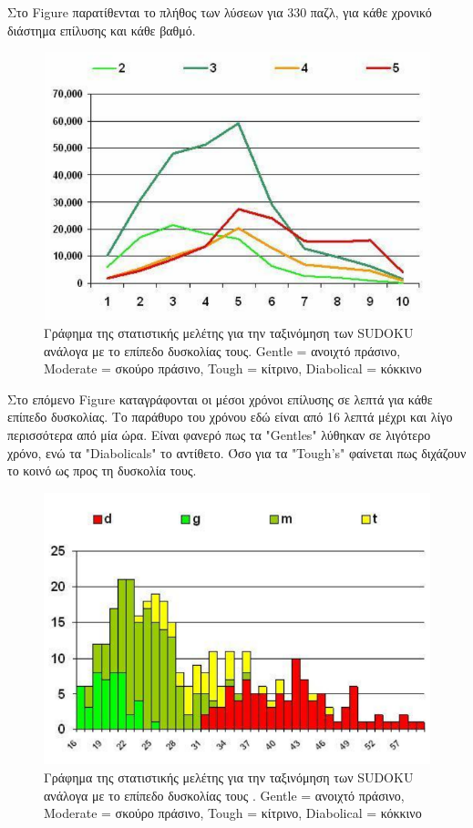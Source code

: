 \documentclass[12pt]{book}
\theoremstyle{definition}
\begin{document}
Στο Figure παρατίθενται το πλήθος των λύσεων για 330 παζλ, για κάθε χρονικό διάστημα επίλυσης και κάθε βαθμό.

\begin{figure}[h]
	\centering
	\includegraphics[scale=0.45]{Figures/stat1.png}
	\caption{Γράφημα της στατιστικής μελέτης για την ταξινόμηση των SUDOKU ανάλογα με το επίπεδο δυσκολίας τους. Gentle = ανοιχτό πράσινο, Moderate = σκούρο πράσινο, Tough = κίτρινο, Diabolical = κόκκινο}
\end{figure}

Στο επόμενο Figure καταγράφονται οι μέσοι χρόνοι επίλυσης σε λεπτά για κάθε επίπεδο δυσκολίας. Το παράθυρο του χρόνου εδώ είναι από 16 λεπτά μέχρι και λίγο περισσότερα από μία ώρα. Είναι φανερό πως τα "Gentles" λύθηκαν σε λιγότερο χρόνο, ενώ τα "Diabolicals" το αντίθετο. Όσο για τα "Tough's" φαίνεται πως διχάζουν το κοινό ως προς τη δυσκολία τους.

\begin{figure}[h]
	\centering
	\includegraphics[scale=0.55]{Figures/stat2.png}
	\caption{Γράφημα της στατιστικής μελέτης για την ταξινόμηση των SUDOKU ανάλογα με το επίπεδο δυσκολίας τους . Gentle = ανοιχτό πράσινο, Moderate = σκούρο πράσινο, Tough = κίτρινο, Diabolical = κόκκινο}
\end{figure}
\end{document}
